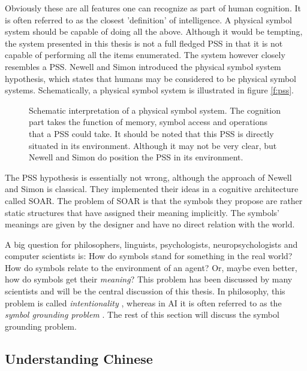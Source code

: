 Obviously these are all features one can recognize as part of human cognition. It is often referred to as the closest 'definition' of intelligence. A physical symbol system should be capable of doing all the above. Although it would be tempting, the system presented in this thesis is not a full fledged PSS in that it is not capable of performing all the items enumerated. The system however closely resembles a PSS. Newell and Simon introduced the physical symbol system hypothesis, which states that humans may be considered to be physical symbol systems. Schematically, a physical symbol system is illustrated in figure \ref{f:pss}.

\begin{figure}[t]
\centerline{}
\caption{Schematic interpretation of a physical symbol system. The cognition part takes the function of memory, symbol access and operations that a PSS could take. It should be noted that this PSS is directly situated in its environment. Although it may not be very clear, but Newell and Simon do position the PSS in its environment.}
\end{figure}
\label{f:pss}

\p
{}The PSS hypothesis is essentially not wrong, although the approach of Newell and Simon is classical. They implemented their ideas in a cognitive architecture called SOAR. The problem of SOAR is that the symbols they propose are rather static structures that have assigned their meaning implicitly. The symbols' meanings are given by the designer and have no direct relation with the world.

A big question for philosophers, linguists, psychologists, neuropsychologists and computer scientists is: How do symbols stand for something in the real world? How do symbols relate to the environment of an agent? Or, maybe even better, how do symbols get their {\em meaning}? This problem has been discussed by many scientists and will be the central discussion of this thesis. In philosophy, this problem is called {\em intentionality} \cite{bretano:1874}, whereas in AI it is often referred to as the {\em symbol grounding problem} \cite{harnad:1990}. The rest of this section will discuss the symbol grounding problem.

\subsection{Understanding Chinese}

